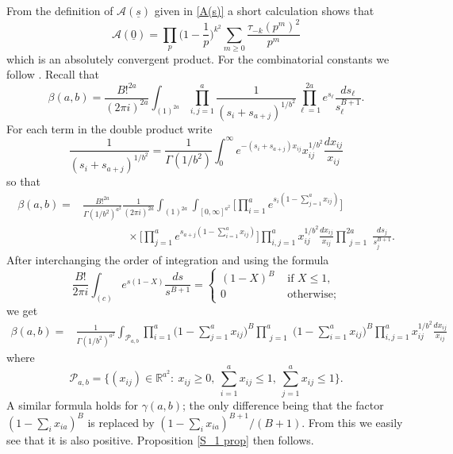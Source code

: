 \documentclass[oneside, 12pt]{amsart}
\theoremstyle{definition}
\newcommand{\mc}{\mathcal}
\newcommand{\ul}{\underline}
\newcommand{\geqs}{\geqslant }
\begin{document}
 From the definition of $\mc{A}(\ul{s})$ given in \eqref{A(s)} a short calculation shows that 
\[
\mc{A}(\ul{0})=\prod_p \bigg(1-\frac{1}{p}\bigg)^{k^2}\sum_{m\geqs 0}\frac{\tau_{-k}(p^m)^2}{p^m}
\]
which is an absolutely convergent product. For the combinatorial constants we follow \cite[Lemma 8]{BH}. Recall that  
\[
\beta(a,b)=
 \frac{B!^{2a} }{(2\pi i )^{2a}} \int_{(1)^{2a}} \prod_{i,j=1}^a\frac{1}{(s_i+s_{a+j})^{1/b^2}} 
 \prod_{\ell=1}^{2a}e^{s_\ell}\frac{ds_\ell}{s_\ell^{B+1}}.
\]
For each term in the double product write 
\[
\frac{1}{(s_i+s_{a+j})^{1/b^2}} = \frac{1}{\Gamma(1/b^2)}\int_0^\infty e^{-(s_i+s_{a+j})x_{ij}}x_{ij}^{1/b^2}\frac{dx_{ij}}{x_{ij}}
\]
so that
\begin{align*}
\beta(a,b) = &\frac{B!^{2a}}{\Gamma(1/b^2)^{a^2} }\frac{1}{(2\pi i)^{2a}}\int_{(1)^{2a}} \int_{[0,\infty]^{a^2}} \Big[\prod_{i=1}^a e^{s_i(1-\sum_{j=1}^a x_{ij} )}\Big]\\
                   &\qquad\qquad\times \Big[  \prod_{j=1}^a e^{s_{a+j}(1-\sum_{i=1}^a x_{ij} )} \Big] \prod_{i,j=1 }^a x_{ij}^{1/b^2} \frac{ dx_{ij} }{ x_{ij} }\prod_{\substack{j=1}}^{2a}\frac{ds_j}{s_j^{B+1}}.
\end{align*}
After interchanging the order of integration and using the formula
\[
\frac{B!}{2\pi i}\int_{(c)} e^{s(1-X)}\frac{ds}{s^{B+1}} = \begin{cases}
      (1-X)^B & \text{ if } X\leqslant 1, \\
      0       & \text{ otherwise};
    \end{cases}
\]
we get
\begin{align*}
\beta(a,b) = & \frac{1}{\Gamma(1/b^2)^{a^2}}\int_{\mathscr{P}_{a,b}}\prod_{i=1}^a \bigg(1-\sum_{j=1}^a x_{ij}  \bigg)^B\prod_{\substack{j=1}}^a \bigg(1-\sum_{i=1}^a x_{ij}  \bigg)^B \prod_{i,j=1 }^a x_{ij}^{1/b^2} \frac{ dx_{ij} }{ x_{ij} }
\end{align*}
where
\[
\mathscr P_{a,b} = \Big\{ (x_{ij})\in\mathbb R^{a^2}:\  x_{ij}\geqslant 0,\  \sum_{i=1}^a x_{ij}\leqslant 1,\   \sum_{j=1}^a x_{ij}\leqslant 1  \Big\}.
\]
A similar formula holds for $\gamma(a,b)$; the only difference being that the factor $(1-\sum_i x_{ia})^B$ is replaced by $(1-\sum_i x_{ia})^{B+1}/(B+1)$. From this we easily see that it is also positive. Proposition \ref{S_1 prop} then follows.








\end{document}
